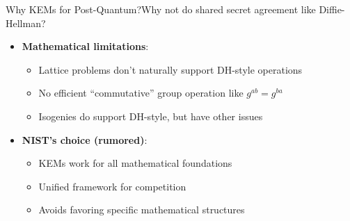 \documentclass[aspectratio=169, lualatex]{beamer} %
\begin{document}
\begin{frame}{Why KEMs for Post-Quantum?}{Why not do shared secret agreement like Diffie-Hellman?}
	\vspace{-1cm}
	\begin{itemize}
		\item \textbf{Mathematical limitations}:
		      \begin{itemize}
			      \item Lattice problems don't naturally support DH-style operations
			      \item No efficient ``commutative'' group operation like $g^{ab} = g^{ba}$
			      \item Isogenies do support DH-style, but have other issues
		      \end{itemize}\pause
		\item \textbf{NIST's choice (rumored)}:
		      \begin{itemize}
			      \item KEMs work for all mathematical foundations
			      \item Unified framework for competition
			      \item Avoids favoring specific mathematical structures
		      \end{itemize}
	\end{itemize}
\end{frame}
\end{document}
